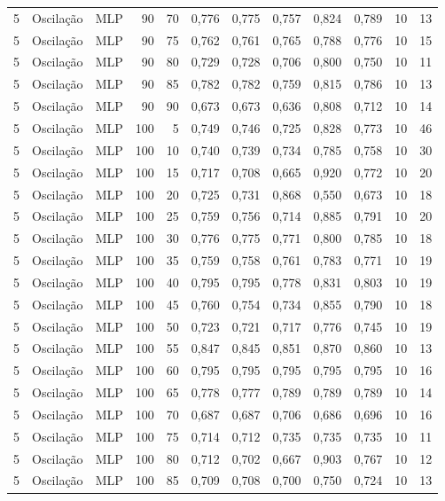 \begin{longtable}{@{}rllrrrrrrrrr@{}}
5 & Oscilação & MLP & 90 & 70 & 0,776 & 0,775 & 0,757 & 0,824 & 0,789 & 10 & 13 \\
5 & Oscilação & MLP & 90 & 75 & 0,762 & 0,761 & 0,765 & 0,788 & 0,776 & 10 & 15 \\
5 & Oscilação & MLP & 90 & 80 & 0,729 & 0,728 & 0,706 & 0,800 & 0,750 & 10 & 11 \\
5 & Oscilação & MLP & 90 & 85 & 0,782 & 0,782 & 0,759 & 0,815 & 0,786 & 10 & 13 \\
5 & Oscilação & MLP & 90 & 90 & 0,673 & 0,673 & 0,636 & 0,808 & 0,712 & 10 & 14 \\
5 & Oscilação & MLP & 100 & 5 & 0,749 & 0,746 & 0,725 & 0,828 & 0,773 & 10 & 46 \\
5 & Oscilação & MLP & 100 & 10 & 0,740 & 0,739 & 0,734 & 0,785 & 0,758 & 10 & 30 \\
5 & Oscilação & MLP & 100 & 15 & 0,717 & 0,708 & 0,665 & 0,920 & 0,772 & 10 & 20 \\
5 & Oscilação & MLP & 100 & 20 & 0,725 & 0,731 & 0,868 & 0,550 & 0,673 & 10 & 18 \\
5 & Oscilação & MLP & 100 & 25 & 0,759 & 0,756 & 0,714 & 0,885 & 0,791 & 10 & 20 \\
5 & Oscilação & MLP & 100 & 30 & 0,776 & 0,775 & 0,771 & 0,800 & 0,785 & 10 & 18 \\
5 & Oscilação & MLP & 100 & 35 & 0,759 & 0,758 & 0,761 & 0,783 & 0,771 & 10 & 19 \\
5 & Oscilação & MLP & 100 & 40 & 0,795 & 0,795 & 0,778 & 0,831 & 0,803 & 10 & 19 \\
5 & Oscilação & MLP & 100 & 45 & 0,760 & 0,754 & 0,734 & 0,855 & 0,790 & 10 & 18 \\
5 & Oscilação & MLP & 100 & 50 & 0,723 & 0,721 & 0,717 & 0,776 & 0,745 & 10 & 19 \\
5 & Oscilação & MLP & 100 & 55 & 0,847 & 0,845 & 0,851 & 0,870 & 0,860 & 10 & 13 \\
5 & Oscilação & MLP & 100 & 60 & 0,795 & 0,795 & 0,795 & 0,795 & 0,795 & 10 & 16 \\
5 & Oscilação & MLP & 100 & 65 & 0,778 & 0,777 & 0,789 & 0,789 & 0,789 & 10 & 14 \\
5 & Oscilação & MLP & 100 & 70 & 0,687 & 0,687 & 0,706 & 0,686 & 0,696 & 10 & 16 \\
5 & Oscilação & MLP & 100 & 75 & 0,714 & 0,712 & 0,735 & 0,735 & 0,735 & 10 & 11 \\
5 & Oscilação & MLP & 100 & 80 & 0,712 & 0,702 & 0,667 & 0,903 & 0,767 & 10 & 12 \\
5 & Oscilação & MLP & 100 & 85 & 0,709 & 0,708 & 0,700 & 0,750 & 0,724 & 10 & 13 \\

\end{longtable}
